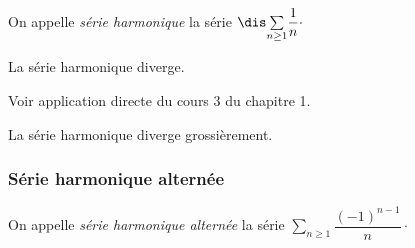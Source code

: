 \documentclass[a4paper,10pt]{report}
\newcommand{\Sum}[2]{\ensuremath{\textstyle{\sum\limits_{#1}^{#2}}}}
\begin{document}
\noindent On appelle \textit{série harmonique} la série $\dis \Sum{n \geq 1}{} \dfrac{1}{n} \cdot$

\begin{thm} La série harmonique diverge.
\end{thm}

\begin{preuve} Voir application directe du cours 3 du chapitre 1.
%
\end{preuve}

\begin{rem} La série harmonique diverge grossièrement.
\end{rem}

\subsubsection{Série harmonique alternée}

\noindent On appelle \textit{série harmonique alternée} la série $ \Sum{n \geq 1}{} \dfrac{(-1)^{n-1}}{n} \cdot$

\medskip
\end{document}
